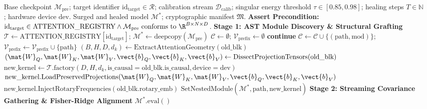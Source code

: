 \begin{algorithm}[H]
\caption[End-to-End Neural Attention Surgery Pipeline]{End-to-End Neural Attention Surgery Pipeline}
\label{alg:surgery_pipeline}
\begin{algorithmic}[1]
\REQUIRE Base checkpoint $\mathcal{M}_{\text{pre}}$; target identifier $\text{id}_{\text{target}} \in \mathcal{R}$; calibration stream $\mathcal{D}_{\text{calib}}$; singular energy threshold $\tau \in [0.85, 0.98]$; healing steps $T \in \mathbb{N}$; hardware device $\text{dev}$.
\ENSURE Surged and healed model $\mathcal{M}^*$; cryptographic manifest $\mathfrak{M}$.
\STATE \textbf{Assert Precondition:} $\text{id}_{\text{target}} \in \text{ATTENTION\_REGISTRY} \land \mathcal{M}_{\text{pre}} \text{ conforms to } \R^{B \times N \times D}$.
\STATE \textbf{Stage 1: AST Module Discovery \& Structural Grafting}
\STATE $\mathcal{T} \leftarrow \text{ATTENTION\_REGISTRY}[\text{id}_{\text{target}}]$; $\mathcal{M}^* \leftarrow \text{deepcopy}(\mathcal{M}_{\text{pre}})$
\STATE $\mathcal{C} \leftarrow \emptyset$; $\mathcal{V}_{\text{prefix}} \leftarrow \emptyset$
        \STATE \textbf{continue} 
    \ENDIF
        \STATE $\mathcal{C} \leftarrow \mathcal{C} \cup \{(\text{path}, \text{mod})\}$; $\mathcal{V}_{\text{prefix}} \leftarrow \mathcal{V}_{\text{prefix}} \cup \{\text{path}\}$
    \ENDIF
\ENDFOR
{}
    \STATE $(B, H, D, d_k) \leftarrow \text{ExtractAttentionGeometry}(\text{old\_blk})$
    \STATE $(\mat{W}_Q, \mat{W}_K, \mat{W}_V, \vect{b}_Q, \vect{b}_K, \vect{b}_V) \leftarrow \text{DissectProjectionTensors}(\text{old\_blk})$
    \STATE $\text{new\_kernel} \leftarrow \mathcal{T}.\text{factory}(D, H, d_k, \text{is\_causal}=\text{old\_blk.is\_causal}, \text{device}=\text{dev})$
    \STATE $\text{new\_kernel}.\text{LoadPreservedProjections}(\mat{W}_Q, \mat{W}_K, \mat{W}_V, \vect{b}_Q, \vect{b}_K, \vect{b}_V)$
        \STATE $\text{new\_kernel}.\text{InjectRotaryFrequencies}(\text{old\_blk.rotary\_emb})$
    \ENDIF
    \STATE $\text{SetNestedModule}(\mathcal{M}^*, \text{path}, \text{new\_kernel})$
\ENDFOR
\STATE \textbf{Stage 2: Streaming Covariance Gathering \& Fisher-Ridge Alignment}
\STATE $\mathcal{M}^*.\text{eval}()$

\end{algorithmic}
\end{algorithm}
